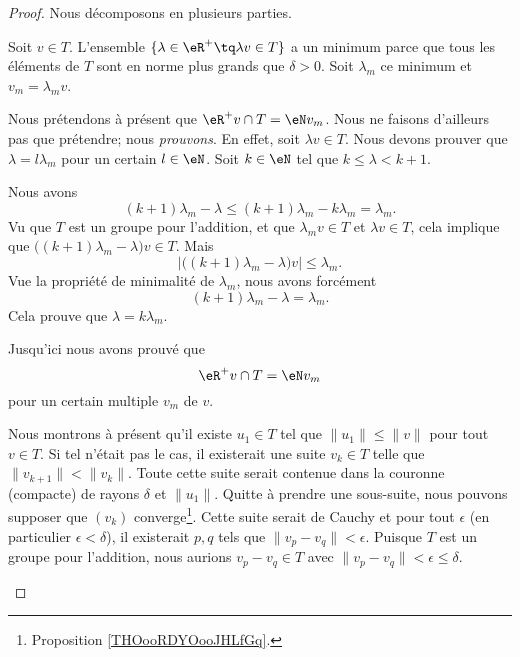 \begin{proof}
	Nous décomposons en plusieurs parties.

	\begin{subproof}
		\spitem[\( \eR^+v\cap T=\eN v_m\)]
		Soit \( v\in T\). L'ensemble \( \{ \lambda \in \eR^+\tq \lambda v\in T\}\) a un minimum parce que tous les éléments de \( T\) sont en norme plus grands que \( \delta>0\). Soit \( \lambda_m\) ce minimum et \( v_m=\lambda_mv\).

		Nous prétendons à présent que \( \eR^+v\cap T=\eN v_m\). Nous ne faisons d'ailleurs pas que prétendre; nous \emph{prouvons}. En effet, soit \( \lambda v\in T\). Nous devons prouver que \( \lambda = l\lambda_m\) pour un certain \( l\in \eN\). Soit \( k\in \eN\) tel que \( k\leq \lambda<k+1\).

		Nous avons
		\begin{equation}
			(k+1)\lambda_m-\lambda\leq (k+1)\lambda_m-k\lambda_m=\lambda_m.
		\end{equation}
		Vu que \( T\) est un groupe pour l'addition, et que \( \lambda_mv\in T\) et \( \lambda v\in T\), cela implique que \( \big( (k+1)\lambda_m-\lambda \big)v\in T\). Mais
		\begin{equation}
			| \big( (k+1)\lambda_m-\lambda \big)v |\leq \lambda_m.
		\end{equation}
		Vue la propriété de minimalité de \( \lambda_m\), nous avons forcément
		\begin{equation}
			(k+1)\lambda_m-\lambda = \lambda_m.
		\end{equation}
		Cela prouve que \( \lambda=k\lambda_m\).

		Jusqu'ici nous avons prouvé que
		\begin{equation}
			\eR^+v\cap T=\eN v_m
		\end{equation}
		pour un certain multiple \( v_m\) de \( v\).


		Nous montrons à présent qu'il existe \( u_1\in T\) tel que \( \| u_1 \|\leq \| v \|\) pour tout \( v\in T\). Si tel n'était pas le cas, il existerait une suite \( v_k\in T\) telle que \( \| v_{k+1} \|<\| v_k \|\). Toute cette suite serait contenue dans la couronne (compacte) de rayons \( \delta\) et \( \| u_1 \|\). Quitte à prendre une sous-suite, nous pouvons supposer que \( (v_k)\) converge\footnote{Proposition \ref{THOooRDYOooJHLfGq}.}. Cette suite serait de Cauchy et pour tout \( \epsilon\) (en particulier \( \epsilon<\delta\)), il existerait \( p,q\) tels que \( \| v_p-v_q \|<\epsilon\). Puisque \( T\) est un groupe pour l'addition, nous aurions \( v_p-v_q\in T\) avec \( \| v_p-v_q \|<\epsilon\leq \delta\).


\end{subproof}
\end{proof}
